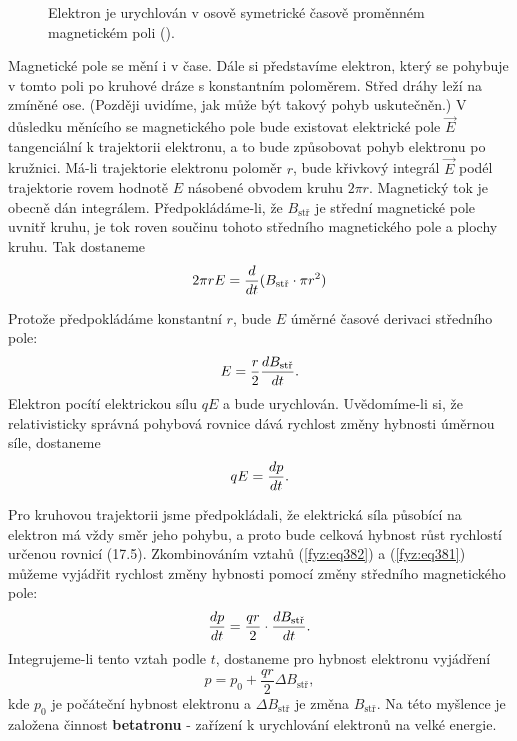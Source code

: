   \begin{figure}[hb!]
    \centering
                  \newline
    \caption{Elektron je urychlován v osově symetrické časově proměnném magnetickém poli
             (\cite[s.~297]{Feynman02}).}
    \label{fyz:fig335}
  \end{figure}
  
  Magnetické pole se mění i v čase. Dále si představíme elektron, který se pohybuje v tomto poli po 
  kruhové dráze s konstantním poloměrem. Střed dráhy leží na zmíněné ose. (Později uvidíme, jak 
  může být takový pohyb uskutečněn.) V důsledku měnícího se magnetického pole bude existovat 
  elektrické pole \(\vec{E}\) tangenciální k trajektorii elektronu, a to bude způsobovat pohyb 
  elektronu po kružnici. Má-li trajektorie elektronu poloměr \(r\), bude křivkový integrál 
  \(\vec{E}\) podél trajektorie rovem hodnotě \(E\) násobené obvodem kruhu \(2\pi r\). Magnetický 
  tok je obecně dán integrálem. Předpokládáme-li, že \(B_{\text{stř}}\) je střední magnetické pole 
  uvnitř kruhu, je tok roven součinu tohoto středního magnetického pole a plochy kruhu. Tak 
  dostaneme
  \begin{equation*}
    2\pi rE = \dfrac{d }{d t}(B_\text{stř}\cdot\pi r^2)
  \end{equation*}
  
  Protože předpokládáme konstantní \(r\), bude \(E\) úměrné časové derivaci středního pole:
  \begin{equation}\label{fyz:eq381}
    E = \frac{r}{2}\dfrac{d B_{\text{stř}}}{d t}.
  \end{equation}
  Elektron pocítí elektrickou sílu \(qE\) a bude urychlován. Uvědomíme-li si, že relativisticky 
  správná pohybová rovnice dává rychlost změny hybnosti úměrnou síle, dostaneme
  \begin{equation}\label{fyz:eq382}
    qE = \dfrac{d p}{d t}.
  \end{equation}
  
  Pro kruhovou trajektorii jsme předpokládali, že elektrická síla působící na elektron má vždy směr 
  jeho pohybu, a proto bude celková hybnost růst rychlostí určenou rovnicí (17.5). Zkombinováním 
  vztahů (\ref{fyz:eq382}) a (\ref{fyz:eq381}) můžeme vyjádřit rychlost změny hybnosti pomocí změny 
  středního magnetického pole:
  \begin{equation}\label{fyz:eq383}
    \dfrac{d p}{d t} = \frac{qr}{2}\cdot\dfrac{d B_{\text{stř}}}{d t}.
  \end{equation}
   Integrujeme-li tento vztah podle \(t\), dostaneme pro hybnost elektronu vyjádření
  \begin{equation}\label{fyz:eq384}
    p = p_0 + \frac{qr}{2}\Delta B_{\text{stř}},
  \end{equation}
  kde \(p_0\) je počáteční hybnost elektronu a \(\Delta B_{\text{stř}}\) je změna 
  \(B_{\text{stř}}\). Na této myšlence je založena činnost \textbf{betatronu} - zařízení k 
  urychlování elektronů na velké energie.
   
